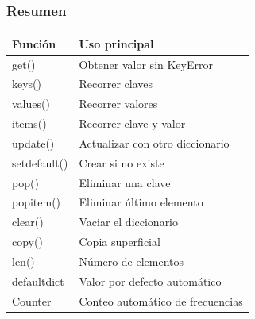 \vspace{0.3cm}

\subsubsection*{Resumen}

\begin{center}
\begin{tabular}{|l|l|}
\hline
Función & Uso principal \\ \hline
get() & Obtener valor sin KeyError \\ \hline
keys() & Recorrer claves \\ \hline
values() & Recorrer valores \\ \hline
items() & Recorrer clave y valor \\ \hline
update() & Actualizar con otro diccionario \\ \hline
setdefault() & Crear si no existe \\ \hline
pop() & Eliminar una clave \\ \hline
popitem() & Eliminar último elemento \\ \hline
clear() & Vaciar el diccionario \\ \hline
copy() & Copia superficial \\ \hline
len() & Número de elementos \\ \hline
defaultdict & Valor por defecto automático \\ \hline
Counter & Conteo automático de frecuencias \\ \hline
\end{tabular}
\end{center}
